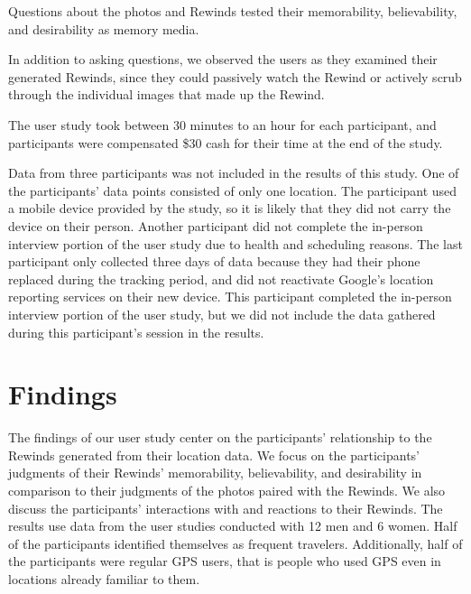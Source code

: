 \documentclass{sigchi}
\begin{document}
Questions about the photos and Rewinds tested their memorability, believability, and desirability as memory media.

In addition to asking questions, we observed the users as they examined their generated Rewinds, since they could passively watch the Rewind or actively scrub through the individual images that made up the Rewind. 

The user study took between 30 minutes to an hour for each participant, and participants were compensated \$30 cash for their time at the end of the study.

Data from three participants was not included in the results of this study. One of the participants' data points consisted of only one location. The participant used a mobile device provided by the study, so it is likely that they did not carry the device on their person. Another participant did not complete the in-person interview portion of the user study due to health and scheduling reasons. The last participant only collected three days of data because they had their phone replaced during the tracking period, and did not reactivate Google's location reporting services on their new device. This participant completed the in-person interview portion of the user study, but we did not include the data gathered during this participant's session in the results.

\section{Findings}
The findings of our user study center on the participants' relationship to the Rewinds generated from their location data. We focus on the participants' judgments of their Rewinds' memorability, believability, and desirability in comparison to their judgments of the photos paired with the Rewinds. We also discuss the participants' interactions with and reactions to their Rewinds. The results use data from the user studies conducted with 12 men and 6 women. Half of the participants identified themselves as frequent travelers. Additionally, half of the participants were regular GPS users, that is people who used GPS even in locations already familiar to them.
\end{document}
